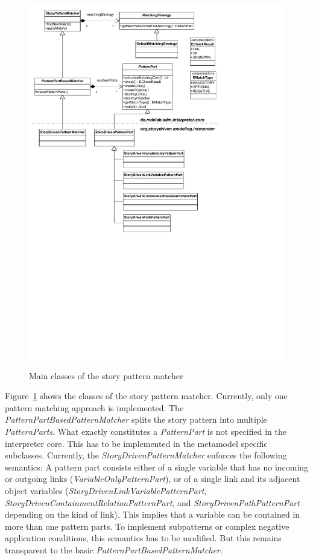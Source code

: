 \begin{figure}[htb]
  \centering
  \includegraphics[width=1.0\columnwidth]{./figures/interpreter_storyPatternMatcher.pdf}
  \caption{Main classes of the story pattern matcher}
  \label{fig:interpreter_storyPatternMatcher}
\end{figure}

Figure~\ref{fig:interpreter_storyPatternMatcher} shows the classes of the story pattern matcher. 
Currently, only one pattern matching approach is implemented. 
The \emph{PatternPartBasedPatternMatcher} splits the story pattern into multiple \emph{PatternParts}. 
What exactly constitutes a \emph{PatternPart} is not specified in the interpreter core. 
This has to be implemented in the metamodel specific subclasses. 
Currently, the \emph{StoryDrivenPatternMatcher} enforces the following semantics: A pattern part consists either of a single variable that has no incoming or outgoing links (\emph{VariableOnlyPatternPart}), or of a single link and its adjacent object variables (\emph{StoryDrivenLinkVariablePatternPart}, \emph{StoryDrivenContainmentRelationPatternPart}, and \emph{StoryDrivenPathPatternPart} depending on the kind of link). 
This implies that a variable can be contained in more than one pattern parts. 
To implement subpatterns or complex negative application conditions, this semantics has to be modified. 
But this remains transparent to the basic \emph{PatternPartBasedPatternMatcher}.

